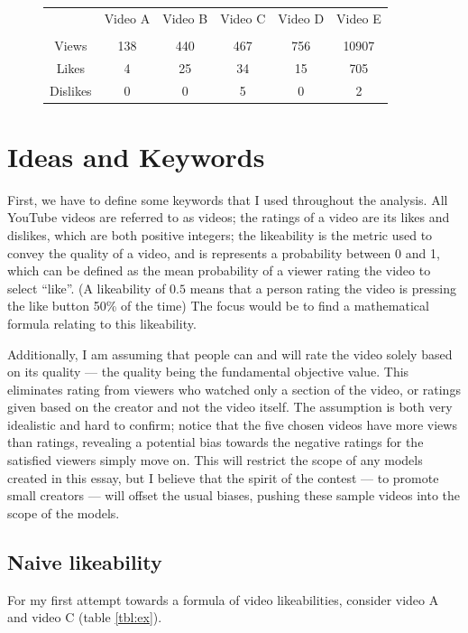 \documentclass[a4paper,11pt]{article}
\begin{document}
\begin{figure}[H]
    \centering
    \begin{tabular}{c|c|c|c|c|c}
        & Video A & Video B  & Video C  & Video D  & Video E  \\
        &  \parencite{marinov_2021} & \parencite{youtube_2021} & \parencite{aggarwal_2021} & \parencite{hoodys_2021} & \parencite{callaham_2021}\\
        \hline
        \hline
        Views & 138 & 440 & 467 & 756 & 10907 \\
        \hline
        Likes & 4 & 25 & 34 & 15 & 705 \\
        \hline
        Dislikes & 0 & 0 & 5 & 0 & 2
    \end{tabular}
    \label{tbl:videos}
\end{figure}


\section{Ideas and Keywords}
First, we have to define some keywords that I used throughout the analysis. All YouTube videos are referred to as videos; the ratings of a video are its likes and dislikes, which are both positive integers; the likeability is the metric used to convey the quality of a video, and is represents a probability between 0 and 1, which can be defined as the mean probability of a viewer rating the video to select ``like''. (A likeability of $0.5$ means that a person rating the video is pressing the like button 50\% of the time) The focus would be to find a mathematical formula relating to this likeability.

Additionally, I am assuming that people can and will rate the video solely based on its quality --- the quality being the fundamental objective value. This eliminates rating from viewers who watched only a section of the video, or ratings given based on the creator and not the video itself. The assumption is both very idealistic and hard to confirm; notice that the five chosen videos have more views than ratings, revealing a potential bias towards the negative ratings for the satisfied viewers simply move on. This will restrict the scope of any models created in this essay, but I believe that the spirit of the contest --- to promote small creators --- will offset the usual biases, pushing these sample videos into the scope of the models.

\subsection{Naive likeability}
For my first attempt towards a formula of video likeabilities, consider video A and video C (table \ref{tbl:ex}).
\end{document}
